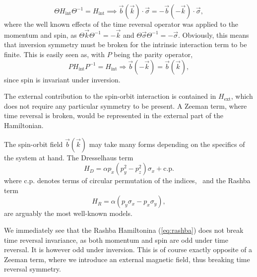 \begin{equation}
  \Theta H_\text{int} \Theta ^{-1} = H_\text{int}
  \implies 
  \vec{b}(\vec{k}) \cdot \vec{\sigma} = -\vec{b}(-\vec{k}) \cdot \vec{\sigma},
\end{equation}
where the well known effects of the time reversal operator was applied to the momentum and spin, as $\Theta \vec{k} \Theta ^{-1} = -\vec{k}$ and $\Theta \vec{\sigma} \Theta ^{-1} = -\vec{\sigma}$.
Obviously, this means that inversion symmetry must be broken for the intrinsic interaction term  to be finite.
This is easily seen as, with $P$ being the parity operator,
\begin{equation}
  P H_\text{int} P^{-1} = H_\text{int} \Rightarrow
  \vec{b}(-\vec{k}) = \vec{b}(\vec{k}),
\end{equation}
since spin is invariant under inversion.


The external contribution to the spin-orbit interaction is contained in $H_\text{ext}$, which does not require any particular symmetry to be present.
A Zeeman term, where time reversal is broken, would be represented in the external part of the Hamiltonian.


The spin-orbit field $\vec{b}(\vec{k})$ may take many forms depending on the specifics of the system at hand.
The Dresselhaus term
\begin{equation}
  H_D = \alpha p_x (p_y^2 - p_z^2) \sigma_x + \text{c.p.}
\end{equation}
where c.p. denotes terms of circular permutation of the indices,~\cite{manchonNewPerspectivesRashba2015} and the Rashba term~\cite{wuTwoDimensionalGiantTunable2020}
\begin{equation}\label{eq:rashba}
  H_R = \alpha (p_y \sigma_x - p_x \sigma_y),
\end{equation}
are arguably the most well-known models.

We immediately see that the Rashba Hamiltonina (\ref{eq:rashba}) does not break time reversal invariance, as both momentum and spin are odd under time reversal.
It is however odd under inversion.
This is of course exactly opposite of a Zeeman term, where we introduce an external magnetic field, thus breaking time reversal symmetry.

